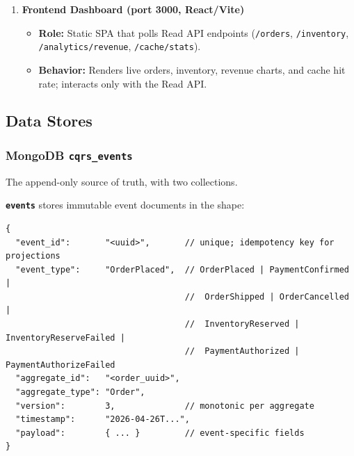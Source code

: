 \documentclass[11pt,a4paper]{article}
\newcommand{\code}[1]{\texttt{\small #1}}
\begin{document}
\begin{enumerate}
  \item \textbf{Frontend Dashboard (port 3000, React/Vite)}
  \begin{itemize}
    \item \textbf{Role:} Static SPA that polls Read API endpoints (\code{/orders}, \code{/inventory}, \code{/analytics/revenue}, \code{/cache/stats}).
    \item \textbf{Behavior:} Renders live orders, inventory, revenue charts, and cache hit rate; interacts only with the Read API.
  \end{itemize}

\end{enumerate}
\subsection{Data Stores}

\subsubsection{MongoDB \code{cqrs\_events}}

The append-only source of truth, with two collections.

\textbf{\code{events}} stores immutable event documents in the shape:

\begin{lstlisting}[language=none]
{
  "event_id":       "<uuid>",       // unique; idempotency key for projections
  "event_type":     "OrderPlaced",  // OrderPlaced | PaymentConfirmed |
                                    //  OrderShipped | OrderCancelled |
                                    //  InventoryReserved | InventoryReserveFailed |
                                    //  PaymentAuthorized | PaymentAuthorizeFailed
  "aggregate_id":   "<order_uuid>",
  "aggregate_type": "Order",
  "version":        3,              // monotonic per aggregate
  "timestamp":      "2026-04-26T...",
  "payload":        { ... }         // event-specific fields
}
\end{lstlisting}
\end{document}
